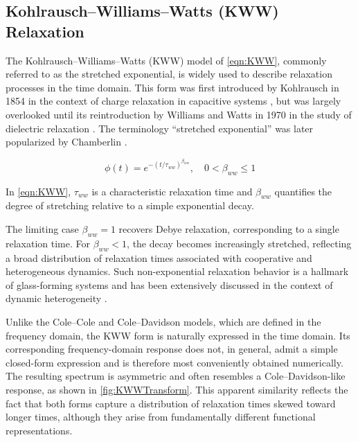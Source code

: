 \subsection{Kohlrausch--Williams--Watts (KWW) Relaxation}

The Kohlrausch--Williams--Watts (KWW) model of \eqn \ref{eqn:KWW}, commonly referred to as the stretched exponential, is widely used to describe relaxation processes in the time domain. This form was first introduced by Kohlrausch in 1854 in the context of charge relaxation in capacitive systems \cite{Kohlrausch1854}, but was largely overlooked until its reintroduction by Williams and Watts in 1970 in the study of dielectric relaxation \cite{Williams}. The terminology ``stretched exponential'' was later popularized by Chamberlin \cite{Chamberlin1984}.

\begin{equation}
	\phi(t) = e^{-(t/\tau_{ww})^{\beta_{ww}}}, \quad 0 < \beta_{ww} \le 1
	\label{eqn:KWW}
\end{equation}

\noindent In \eqn \ref{eqn:KWW}, $\tau_{ww}$ is a characteristic relaxation time and $\beta_{ww}$ quantifies the degree of stretching relative to a simple exponential decay.

The limiting case $\beta_{ww} = 1$ recovers Debye relaxation, corresponding to a single relaxation time. For $\beta_{ww} < 1$, the decay becomes increasingly stretched, reflecting a broad distribution of relaxation times associated with cooperative and heterogeneous dynamics. Such non-exponential relaxation behavior is a hallmark of glass-forming systems and has been extensively discussed in the context of dynamic heterogeneity \cite{Bohmer1993,Ediger2000}.

Unlike the Cole--Cole and Cole--Davidson models, which are defined in the frequency domain, the KWW form is naturally expressed in the time domain. Its corresponding frequency-domain response does not, in general, admit a simple closed-form expression and is therefore most conveniently obtained numerically. The resulting spectrum is asymmetric and often resembles a Cole--Davidson-like response, as shown in \fig \ref{fig:KWWTransform}. This apparent similarity reflects the fact that both forms capture a distribution of relaxation times skewed toward longer times, although they arise from fundamentally different functional representations.


